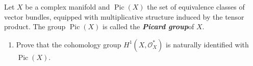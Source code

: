 \begin{manualexercise}{1.7}
	Let $X$ be a complex manifold and $\operatorname{Pic}(X)$ the set of equivalence classes of vector bundles, equipped with multiplicative structure induced by the tensor product. The group $\operatorname{Pic}(X)$ is called the \textit{\textbf{Picard group}}of $X$.
	\begin{enumerate}[label=\alph*.]
		\item Prove that the cohomology group $H^{1}(X,\mathcal{O}^*_X)$ is naturally identified with $\operatorname{Pic}(X)$.
\iffalse		\item Consider the \textit{\textbf{exponential exact sequence}}
			\[\begin{tikzcd}
				0\arrow[r]&0\arrow[r]&\mathbb{Z}_X\arrow[r]&\mathcal{O}_X\arrow[r]&0
			\end{tikzcd}\]
			where $\mathbb{Z}_X$ denotes the constant sheaf. The corresponding long exact sequence
			\[\begin{tikzcd}[column sep=small]
				\cdots\arrow[r]&H^{1}(X,\mathcal{O}_X)\arrow[r]&H^{1}(X,\mathcal{O}^*_X)\arrow[r]&H^{2}(X,\mathbb{Z})\arrow[r]&\cdots
			\end{tikzcd}\]
			takes a line bundle $[L]\in\operatorname{Pic}(X)=H^{1}(X,\mathcal{O}^*_X)$ to an element $c_1(L)\in H^{2}(X,\mathbb{Z})$ called the \textit{\textbf{first Chern class of $L$}}. PRove that a non-trivial bundle $L$ with $c_1(L)=0$ on a compact complex curve has no holomorphic sections.

		\item (*) [content…]\fi
	\end{enumerate}
\end{manualexercise}

